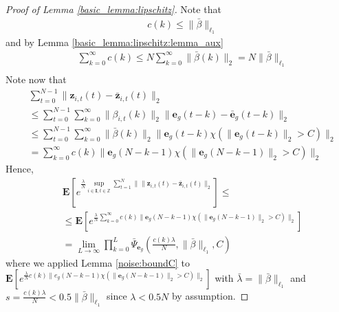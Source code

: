 \documentclass[10pt,a4paper]{amsart}
\newcommand{\bE}{\mathbf{E}}
\newcommand{\e}{\mathbf{e}}
\def\rve{{\mathbf{e}}}
\def\rvz{{\mathbf{z}}}
\begin{document}
\begin{proof}[Proof of Lemma \ref{basic_lemma:lipschitz}]
  Note that 
  \begin{align}
    &  c(k) 
    \le \|\bar{\beta}\|_{\ell_1}
      \label{basic_lemma:lipschitz:eq0.2} 
   \end{align}
    and by Lemma \ref{basic_lemma:lipschitz:lemma_aux}
    \begin{equation}
      \label{basic_lemma:lipschitz:eq1}
      \begin{aligned}
     & \sum_{k=0}^{\infty} c(k) \le N \sum_{k=0}^{\infty} \|\bar{\beta}(k)\|_2 = N \|\bar{\beta}\|_{\ell_1} \\
      \end{aligned}
    \end{equation}
    Note now that 
      \begin{align*}
      & \sum_{t=0}^{N-1}  \|\rvz_{i,t}(t)-\bar{\rvz}_{i,t}(t)\|_2  \\
      & \le
      \sum_{t=0}^{N-1}  \sum_{k=0}^{\infty} \|\beta_{i,t}(k)\|_2 \|\e_g(t-k)-\bar{\e}_g(t-k)\|_2 \\
      & \le \sum_{t=0}^{N-1}  \sum_{k=0}^{\infty} \|\bar{\beta}(k)\|_2 \|\e_g(t-k)\chi(\|\e_g(t-k)\|_2 > C)\|_2 \\
      & =\sum_{k=0}^{\infty} c(k) \|\e_g(N-k-1) \chi(\|\e_g(N-k-1)\|_2 > C)\|_2 
        \end{align*}    
        Hence,
        \begin{align*}
      &\bE[ e^{\frac{\lambda}{N} \sup_{i \in \mathbf{I}, t \in \mathbb{Z}} \sum_{t=1}^{N} \| \|\rvz_{i,t}(t)-\bar{\rvz}_{i,t}(t)\|_2}]
      \le \\
      & \le \bE[e^{\frac{\lambda}{N} \sum_{k=0}^{\infty} 
      c(k) \|\e_g(N-k-1) \chi(\|\e_g(N-k-1)\|_2 > C)\|_2}] \\
      & = \lim_{L \rightarrow \infty} 
      \prod_{k=0}^{L} \bar{\Psi}_{\rve_g}\left(\frac{c(k) \lambda}{N},\|\bar{\beta}\|_{\ell_1},C\right)
        \end{align*}
        where we applied  Lemma \ref{noise:boundC}
        to $\bE[e^{\frac{\lambda}{N} c(k)\|e_g(N-k-1) \chi(\|\e_g(N-k-1)\|_2 > C)\|_2}]$
        with $\bar{\lambda}=\|\bar{\beta}\|_{\ell_1}$ and $s=\frac{c(k)\lambda}{N} < 0.5\|\bar{\beta}\|_{\ell_1}$ since $\lambda<0.5N$ by assumption.


\end{proof}
\end{document}
